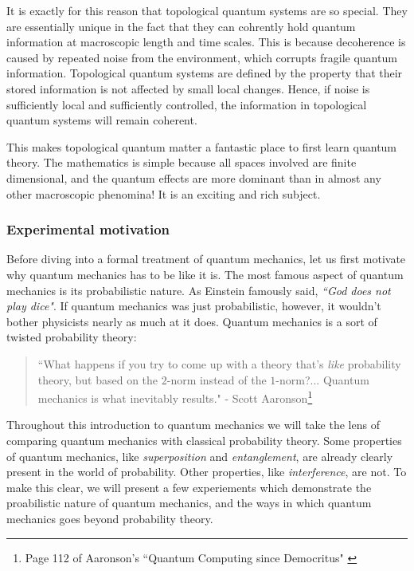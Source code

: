 It is exactly for this reason that topological quantum systems are so special. They are essentially unique in the fact that they can cohrently hold quantum information at macroscopic length and time scales. This is because decoherence is caused by repeated noise from the environment, which corrupts fragile quantum information. Topological quantum systems are defined by the property that their stored information is not affected by small local changes. Hence, if noise is sufficiently local and sufficiently controlled, the information in topological quantum systems will remain coherent. 

This makes topological quantum matter a fantastic place to first learn quantum theory. The mathematics is simple because all spaces involved are finite dimensional, and the quantum effects are more dominant than in almost any other macroscopic phenomina! It is an exciting and rich subject.

\subsubsection{Experimental motivation}

Before diving into a formal treatment of quantum mechanics, let us first motivate why quantum mechanics has to be like it is. The most famous aspect of quantum mechanics is its probabilistic nature. As Einstein famously said, {\em ``God does not play dice"}. If quantum mechanics was just probabilistic, however, it wouldn't bother physicists nearly as much at it does. Quantum mechanics is a sort of twisted probability theory:

\begin{quote}
``What happens if you try to come up with a theory that's {\em like} probability theory, but based on the $2$-norm instead of the $1$-norm?... Quantum mechanics is what inevitably results." - Scott Aaronson\footnote{Page 112 of Aaronson's ``Quantum Computing since Democritus" \cite{aaronson2013quantum}}
\end{quote}

Throughout this introduction to quantum mechanics we will take the lens of comparing quantum mechanics with classical probability theory. Some properties of quantum mechanics, like {\em superposition} and {\em entanglement}, are already clearly present in the world of probability. Other properties, like {\em interference}, are not. To make this clear, we will present a few experiements which demonstrate the proabilistic nature of quantum mechanics, and the ways in which quantum mechanics goes beyond probability theory.


